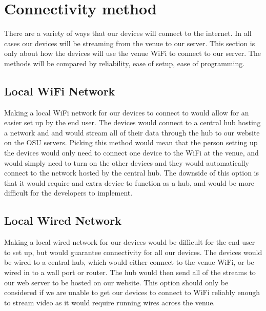 \documentclass[onecolumn, draftclsnofoot,10pt, compsoc]{IEEEtran}
\begin{document}
\section{Connectivity method}
There are a variety of ways that our devices will connect to the internet. In all cases our devices will be streaming from the venue to our server. This section is only about how the devices will use the venue WiFi to connect to our server. The methods will be compared by reliability, ease of setup, ease of programming.
    \subsection{Local WiFi Network}
    Making a local WiFi network for our devices to connect to would allow for an easier set up by the end user. The devices would connect to a central hub hosting a network and and would stream all of their data through the hub to our website on the OSU servers. Picking this method would mean that the person setting up the devices would only need to connect one device to the WiFi at the venue, and would simply need to turn on the other devices and they would automatically connect to the network hosted by the central hub. The downside of this option is that it would require and extra device to function as a hub, and would be more difficult for the developers to implement.

    \subsection{Local Wired Network}
    Making a local wired network for our devices would be difficult for the end user to set up, but would guarantee connectivity for all our devices. The devices would be wired to a central hub, which would either connect to the venue WiFi, or be wired in to a wall port or router. The hub would then send all of the streams to our web server to be hosted on our website. This option should only be considered if we are unable to get our devices to connect to WiFi reliably enough to stream video as it would require running wires across the venue.
\end{document}
